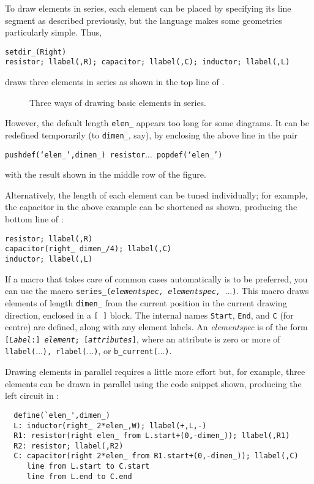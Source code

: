 To draw elements in series, each element can be placed by specifying
its line segment as described previously, but the \pic language
makes some geometries particularly simple.  Thus,

{\tt setdir\_(Right)\\ \hspace*{\parindent}%
  resistor; llabel(,R); capacitor; llabel(,C);
  inductor; llabel(,L)}

\noindent
draws three elements in series
as shown in the top line of .
\begin{figure}[ht]
\vspace{-\baselineskip}
   
   \caption{Three ways of drawing basic elements in series.}
   \label{Series}
   \end{figure}
However, the default length {\tt elen\_}
appears too long for some diagrams.  It can be redefined temporarily
(to {\tt dimen\_}, say),
by enclosing the above line in the pair

{\tt pushdef(`elen\_',dimen\_)
 resistor$\ldots$ popdef(`elen\_')}

\noindent
with the result shown in the middle row of the figure.

Alternatively, the length of each element can be tuned individually; for
example, the capacitor in the above example can be shortened as shown,
producing the bottom line of :

{\tt resistor; llabel(,R)\\
 \hspace*{\parindent}%
  capacitor(right\_ dimen\_/4); llabel(,C)\\
 \hspace*{\parindent}%
  inductor; llabel(,L)}

If a macro that takes care of common cases automatically is to be preferred,
you can use the macro {\tt series\_({\sl elementspec, elementspec, $\ldots$})}.
This macro draws elements of length {\tt dimen\_} from the current
position in the current drawing
direction, enclosed in a {\tt [ ]} block.  The internal names
{\tt Start}, {\tt End}, and {\tt C} (for centre) are defined, along with
any element labels.  An {\sl elementspec} is of the form
{\tt[{\sl Label}:] {\sl element}; [{\sl attributes}]},
where an attribute is zero or more of
 {\tt llabel($\ldots$), rlabel($\ldots$)}, or {\tt b\_current($\ldots$)}.

Drawing elements in parallel requires a little more effort but, for example,
three elements can be drawn in parallel using the code snippet shown,
producing the left circuit in :
\begin{verbatim}
  define(`elen_',dimen_)
  L: inductor(right_ 2*elen_,W); llabel(+,L,-)
  R1: resistor(right elen_ from L.start+(0,-dimen_)); llabel(,R1)
  R2: resistor; llabel(,R2)
  C: capacitor(right 2*elen_ from R1.start+(0,-dimen_)); llabel(,C)
     line from L.start to C.start
     line from L.end to C.end
\end{verbatim}

